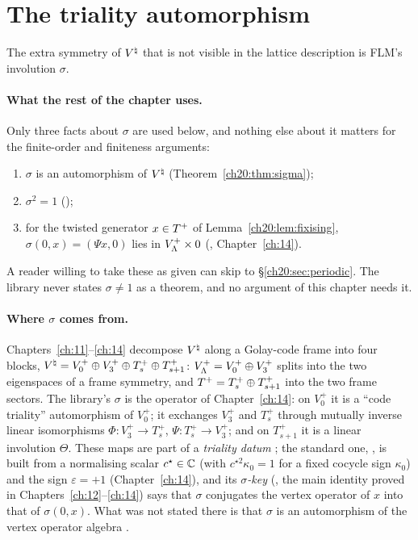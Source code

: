 \section{The triality automorphism}\label{ch20:sec:sigma}

The extra symmetry of ${V^{\natural}}$ that is not visible in the lattice description is FLM's involution $\sigma$.

\paragraph{What the rest of the chapter uses.}  Only three facts about $\sigma$ are used below, and nothing else about it
matters for the finite-order and finiteness arguments:
\begin{enumerate}[label=($\sigma$\arabic*)]
\item $\sigma$ is an automorphism of ${V^{\natural}}$ (Theorem~\ref{ch20:thm:sigma});
\item $\sigma^2=1$ ();
\item for the twisted generator $x\in T^{+}$ of Lemma~\ref{ch20:lem:fixising}, $\sigma(0,x)=(\Psi x,0)$ lies in
  $V_{\Lambda}^{+}\times0$ (, Chapter~\ref{ch:14}).
\end{enumerate}
A reader willing to take these as given can skip to \S\ref{ch20:sec:periodic}.  The library never states $\sigma\neq1$ as a
theorem, and no argument of this chapter needs it.

\paragraph{Where $\sigma$ comes from.}  Chapters~\ref{ch:11}--\ref{ch:14} decompose ${V^{\natural}}$ along a Golay-code frame into
four blocks, ${V^{\natural}}=V_0^+\oplus V_3^+\oplus T_s^+\oplus T_{s+1}^+$: $V_{\Lambda}^{+}=V_0^+\oplus V_3^+$ splits into the two
eigenspaces of a frame symmetry, and $T^{+}=T_s^+\oplus T_{s+1}^+$ into the two frame sectors.  The library's
$\sigma$ is the operator  of Chapter~\ref{ch:14}: on $V_0^+$ it is a ``code triality'' automorphism of $V_0^+$;
it exchanges $V_3^+$ and $T_s^+$ through mutually inverse linear isomorphisms $\Phi:V_3^+\to T_s^+$, $\Psi:T_s^+\to V_3^+$;
and on $T_{s+1}^+$ it is a linear involution $\Theta$.  These maps are part of a \emph{triality datum} ; the
standard one, , is built from a normalising scalar $c^\star\in{\mathbb{C}}$ (with $c^{\star2}\kappa_0=1$ for a fixed
cocycle sign $\kappa_0$) and the sign $\varepsilon=+1$ (Chapter~\ref{ch:14}), and its
\emph{$\sigma$-key} (, the main identity proved in Chapters~\ref{ch:12}--\ref{ch:14}) says that
$\sigma$ conjugates the vertex operator of $x$ into that of $\sigma(0,x)$.  What was not stated there is that $\sigma$ is an
automorphism of the vertex operator algebra .

